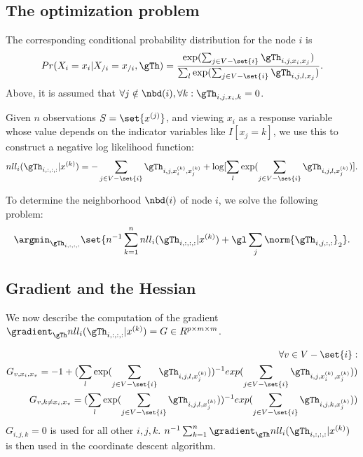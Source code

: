 \documentclass{article}
\begin{document}
\subsection{The optimization problem}
The corresponding conditional probability distribution for the node $i$ is \begin{equation}
Pr(X_i = x_i|X_{/i} = x_{/i}, \gTh) = \frac{\exp(\sum_{j \in V - \set{i}} \gTh_{i, j, x_i, x_j})}{\sum_l \exp(\sum_{j \in V - \set{i}} \gTh_{i, j, l, x_j})}.
\label{eqn:condProbabilityDiscrete}
\end{equation}
Above, it is assumed that $\forall j \notin \nbd(i), \forall k: \gTh_{i, j, x_i, k} = 0$.

Given $n$ observations $S = \set{x^{(j)}}$, and viewing $x_i$ as a response variable whose value depends on the indicator variables like $I[x_j = k]$, we use this to construct a negative log likelihood function: 
$$nll_i(\gTh_{i, :, :, :}|x^{(k)}) = - \sum_{j\in V - \set{i}} \gTh_{i, j, x_i^{(k)}, x_j^{(k)}} + \log[\sum_l \exp(\sum_{j \in V - \set{i}}\gTh_{i, j, l, x_j^{(k)}})].$$

To determine the neighborhood $\nbd(i)$ of node $i$, we solve the following problem:
\begin{equation}
\argmin_{\gTh_{i, :, :, :}} \set{n^{-1} \sum_{k=1}^{n}nll_i(\gTh_{i, :, :, :} |x^{(k)}) + \gl \sum_{j} \norm{\gTh_{i, j, :, :}}_2}.
\label{eqn:optProblemLagrangianDiscrete}
\end{equation}

\subsection{Gradient and the Hessian}
We now describe the computation of the gradient\\
$\gradient_{\gTh} nll_i(\gTh_{i, :, :, :} |x^{(k)}) = G \in R^{p \times m \times m}$.

\begin{equation*}
\begin{split}
\forall v \in V - \set{i}:\\
G_{v, x_i, x_v} = -1 + (\sum_l \exp(\sum_{j \in V - \set{i}}\gTh_{i, j, l, x_j^{(k)}}))^{-1} exp(\sum_{j \in V - \set{i}}\gTh_{i, j, x_i^{(k)}, x_j^{(k)}}))\\
G_{v, k \neq x_i, x_v} = (\sum_l \exp(\sum_{j \in V - \set{i}}\gTh_{i, j, l, x_j^{(k)}}))^{-1} exp(\sum_{j \in V - \set{i}}\gTh_{i, j, k, x_j^{(k)}}))\\
\end{split}
\end{equation*}
$G_{i, j, k} = 0$ is used for all other $i, j, k$. $n^{-1}\sum_{k=1}^{n}\gradient_{\gTh} nll_i(\gTh_{i, :, :, :} |x^{(k)})$ is then used in the coordinate descent algorithm.
\end{document}
